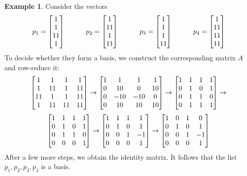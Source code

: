 \documentclass[reqno]{amsart}
\theoremstyle{definition}
\newtheorem{example}[theorem]{Example}
\begin{document}
\begin{example}\label{eg-basis-ii}
 Consider the vectors
 \[
  p_1 = \left[\begin{matrix}  1 \\  1 \\ 11 \\  1 \end{matrix}\right] \hspace{3em}
  p_2 = \left[\begin{matrix}  1 \\ 11 \\  1 \\ 11 \end{matrix}\right] \hspace{3em}
  p_3 = \left[\begin{matrix}  1 \\  1 \\  1 \\ 11 \end{matrix}\right] \hspace{3em}
  p_4 = \left[\begin{matrix}  1 \\ 11 \\ 11 \\ 11 \end{matrix}\right]
 \]
 To decide whether they form a basis, we construct the corresponding
 matrix $A$ and row-reduce it:
 \[ \left[\begin{matrix}  1 &  1 &  1 &  1 \\
          1 & 11 &  1 & 11 \\
         11 &  1 &  1 & 11 \\
          1 & 11 & 11 & 11 \end{matrix}\right]
    \to
    \left[\begin{matrix}  1 &  1 &  1 &  1 \\
          0 & 10 &  0 & 10 \\
          0 &-10 &-10 &  0 \\
          0 & 10 & 10 & 10 \end{matrix}\right]
    \to
    \left[\begin{matrix}  1 &  1 &  1 &  1 \\
          0 &  1 &  0 &  1 \\
          0 &  1 &  1 &  0 \\
          0 &  1 &  1 &  1 \end{matrix}\right]
    \to
 \] \[
    \left[\begin{matrix}  1 &  1 &  1 &  1 \\
          0 &  1 &  0 &  1 \\
          0 &  1 &  1 &  0 \\
          0 &  0 &  0 &  1 \end{matrix}\right]
    \to
    \left[\begin{matrix}  1 &  1 &  1 &  1 \\
          0 &  1 &  0 &  1 \\
          0 &  0 &  1 & -1 \\
          0 &  0 &  0 &  1 \end{matrix}\right]
    \to
    \left[\begin{matrix}  1 &  0 &  1 &  0 \\
          0 &  1 &  0 &  1 \\
          0 &  0 &  1 & -1 \\
          0 &  0 &  0 &  1 \end{matrix}\right]
 \]
 After a few more steps, we obtain the identity matrix.  It follows
 that the list $p_1,p_2,p_3,p_4$ is a basis.
\end{example}
\end{document}
